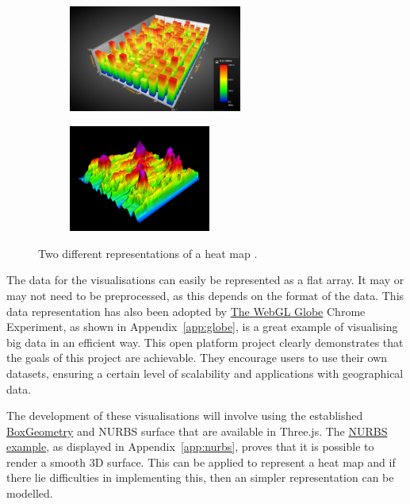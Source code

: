 \documentclass[
	fontsize=11pt
	headlines=2,
	footlines=2,
	parskip=half
]{scrartcl}
\begin{document}
{		\begin{figure}[H]
			\centering
			\begin{subfigure}[b]{0.4\textwidth}
                \includegraphics[width=\textwidth,height=3.5cm]{images/heat-map-1}
	        \end{subfigure}
	        \begin{subfigure}[b]{0.4\textwidth}
                \includegraphics[width=\textwidth,height=3.5cm]{images/heat-map-2}
	        \end{subfigure}
			\caption{Two different representations of a heat map \citep{tuomainen2014financial} \citep{fuchs2006physiological}.}
			\label{fig:heat_maps}
		\end{figure}
		
		The data for the visualisations can easily be represented as a flat array. It may or may not need to be preprocessed, as this depends on the format of the data. This data representation has also been adopted by \href{https://www.chromeexperiments.com/globe}{The WebGL Globe} Chrome Experiment, as shown in Appendix~\ref{app:globe}, is a great example of visualising big data in an efficient way. This open platform project clearly demonstrates that the goals of this project are achievable. They encourage users to use their own datasets, ensuring a certain level of scalability and applications with geographical data.
		
		The development of these visualisations will involve using the established \href{http://threejs.org/docs/#Reference/Extras.Geometries/BoxGeometry}{BoxGeometry} and NURBS surface that are available in Three.js. The \href{http://threejs.org/examples/webgl_geometry_nurbs.html}{NURBS example}, as displayed in Appendix~\ref{app:nurbs}, proves that it is possible to render a smooth 3D surface. This can be applied to represent a heat map and if there lie difficulties in implementing this, then an simpler representation can be modelled.
		
}
\end{document}
